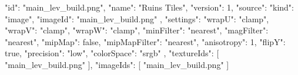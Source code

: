 {
  "id": "main_lev_build.png",
  "name": "Ruins Tiles",
  "version": 1,
  "source": {
    "kind": "image",
    "imageId": "main_lev_build.png"
  },
  "settings": {
    "wrapU": "clamp",
    "wrapV": "clamp",
    "wrapW": "clamp",
    "minFilter": "nearest",
    "magFilter": "nearest",
    "mipMap": false,
    "mipMapFilter": "nearest",
    "anisotropy": 1,
    "flipY": true,
    "precision": "low",
    "colorSpace": "srgb"
  },
  "textureIds": [
    "main_lev_build.png"
  ],
  "imageIds": [
    "main_lev_build.png"
  ]
}
